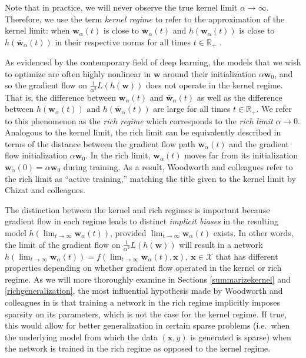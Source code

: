 \documentclass{article}
\begin{document}
Note that in practice, we will never observe the true kernel limit $\alpha \rightarrow \infty$. Therefore, we use the term \textit{kernel regime} to refer to the approximation of the kernel limit: when $\boldsymbol{w}_{\alpha}(t)$ is close to $\boldsymbol{\bar{w}}_{\alpha}(t)$ and $h(\boldsymbol{w}_{\alpha}(t))$ is close to $h(\boldsymbol{\bar{w}}_{\alpha}(t))$ in their respective norms for all times $t \in \mathbb{R}_+$ \cite{woodworth2020kernel}.

As evidenced by the contemporary field of deep learning, the models that we wish to optimize are often highly nonlinear in $\boldsymbol{w}$ around their initialization $\alpha\boldsymbol{w}_0$, and so the gradient flow on $\frac{1}{\alpha^2}L(h(\boldsymbol{w}))$ does not operate in the kernel regime. That is, the difference between $\boldsymbol{w}_{\alpha}(t)$ and $\boldsymbol{\bar{w}}_{\alpha}(t)$ as well as the difference between $h(\boldsymbol{w}_{\alpha}(t))$ and $h(\boldsymbol{\bar{w}}_{\alpha}(t))$ are large for all times $t \in \mathbb{R}_+$. We refer to this phenomenon as the \textit{rich regime} which corresponds to the \textit{rich limit} $\alpha \rightarrow 0$. Analogous to the kernel limit, the rich limit can be equivalently described in terms of the distance between the gradient flow path $\boldsymbol{w}_{\alpha}(t)$ and the gradient flow initialization $\alpha\boldsymbol{w}_0$. In the rich limit, $\boldsymbol{w}_{\alpha}(t)$ moves far from its initialization $\boldsymbol{w}_{\alpha}(0) = \alpha \boldsymbol{w}_0$ during training. As a result, Woodworth and colleagues refer to the rich limit as \enquote{active training,} matching the title given to the kernel limit by Chizat and colleagues.

The distinction between the kernel and rich regimes is important because gradient flow in each regime leads to distinct \textit{implicit biases} in the resulting model $h(\lim_{t \to\infty} \boldsymbol{w}_{\alpha}(t))$, provided $\lim_{t \to\infty} \boldsymbol{w}_{\alpha}(t)$ exists. In other words, the limit of the gradient flow on $\frac{1}{\alpha^2}L(h(\boldsymbol{w}))$ will result in a network $h(\lim_{t \to\infty} \boldsymbol{w}_{\alpha}(t)) = f(\lim_{t \to\infty} \boldsymbol{w}_{\alpha}(t), \boldsymbol{x}), \ \boldsymbol{x} \in \mathcal{X}$ that has different properties depending on whether gradient flow operated in the kernel or rich regime. As we will more thoroughly examine in Sections \ref{summarizekernel} and \ref{richgeneralization}, the most influential hypothesis made by Woodworth and colleagues in \cite{woodworth2020kernel} is that training a network in the rich regime implicitly imposes sparsity on its parameters, which is not the case for the kernel regime. If true, this would allow for better generalization in certain sparse problems (i.e.~when the underlying model from which the data $(\boldsymbol{x}, y)$ is generated is sparse) when the network is trained in the rich regime as opposed to the kernel regime.
\end{document}
